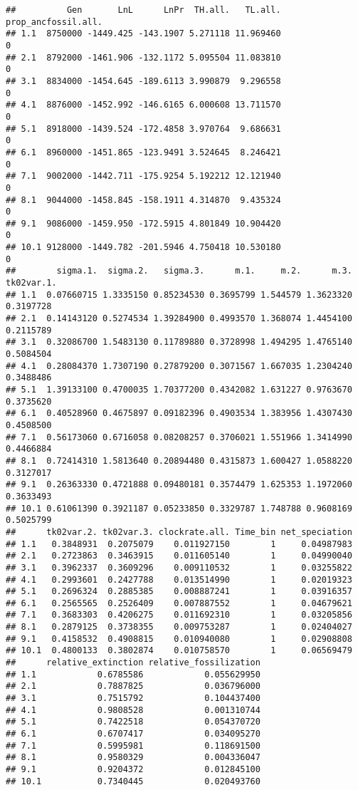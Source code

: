 \documentclass[
]{article}
\begin{document}
\begin{verbatim}
##          Gen       LnL      LnPr  TH.all.   TL.all. prop_ancfossil.all.
## 1.1  8750000 -1449.425 -143.1907 5.271118 11.969460                   0
## 2.1  8792000 -1461.906 -132.1172 5.095504 11.083810                   0
## 3.1  8834000 -1454.645 -189.6113 3.990879  9.296558                   0
## 4.1  8876000 -1452.992 -146.6165 6.000608 13.711570                   0
## 5.1  8918000 -1439.524 -172.4858 3.970764  9.686631                   0
## 6.1  8960000 -1451.865 -123.9491 3.524645  8.246421                   0
## 7.1  9002000 -1442.711 -175.9254 5.192212 12.121940                   0
## 8.1  9044000 -1458.845 -158.1911 4.314870  9.435324                   0
## 9.1  9086000 -1459.950 -172.5915 4.801849 10.904420                   0
## 10.1 9128000 -1449.782 -201.5946 4.750418 10.530180                   0
##        sigma.1.  sigma.2.   sigma.3.      m.1.     m.2.      m.3. tk02var.1.
## 1.1  0.07660715 1.3335150 0.85234530 0.3695799 1.544579 1.3623320  0.3197728
## 2.1  0.14143120 0.5274534 1.39284900 0.4993570 1.368074 1.4454100  0.2115789
## 3.1  0.32086700 1.5483130 0.11789880 0.3728998 1.494295 1.4765140  0.5084504
## 4.1  0.28084370 1.7307190 0.27879200 0.3071567 1.667035 1.2304240  0.3488486
## 5.1  1.39133100 0.4700035 1.70377200 0.4342082 1.631227 0.9763670  0.3735620
## 6.1  0.40528960 0.4675897 0.09182396 0.4903534 1.383956 1.4307430  0.4508500
## 7.1  0.56173060 0.6716058 0.08208257 0.3706021 1.551966 1.3414990  0.4466884
## 8.1  0.72414310 1.5813640 0.20894480 0.4315873 1.600427 1.0588220  0.3127017
## 9.1  0.26363330 0.4721888 0.09480181 0.3574479 1.625353 1.1972060  0.3633493
## 10.1 0.61061390 0.3921187 0.05233850 0.3329787 1.748788 0.9608169  0.5025799
##      tk02var.2. tk02var.3. clockrate.all. Time_bin net_speciation
## 1.1   0.3848931  0.2075079    0.011927150        1     0.04987983
## 2.1   0.2723863  0.3463915    0.011605140        1     0.04990040
## 3.1   0.3962337  0.3609296    0.009110532        1     0.03255822
## 4.1   0.2993601  0.2427788    0.013514990        1     0.02019323
## 5.1   0.2696324  0.2885385    0.008887241        1     0.03916357
## 6.1   0.2565565  0.2526409    0.007887552        1     0.04679621
## 7.1   0.3683303  0.4206275    0.011692310        1     0.03205856
## 8.1   0.2879125  0.3738355    0.009753287        1     0.02404027
## 9.1   0.4158532  0.4908815    0.010940080        1     0.02908808
## 10.1  0.4800133  0.3802874    0.010758570        1     0.06569479
##      relative_extinction relative_fossilization
## 1.1            0.6785586            0.055629950
## 2.1            0.7887825            0.036796000
## 3.1            0.7515792            0.104437400
## 4.1            0.9808528            0.001310744
## 5.1            0.7422518            0.054370720
## 6.1            0.6707417            0.034095270
## 7.1            0.5995981            0.118691500
## 8.1            0.9580329            0.004336047
## 9.1            0.9204372            0.012845100
## 10.1           0.7340445            0.020493760
\end{verbatim}
\end{document}
